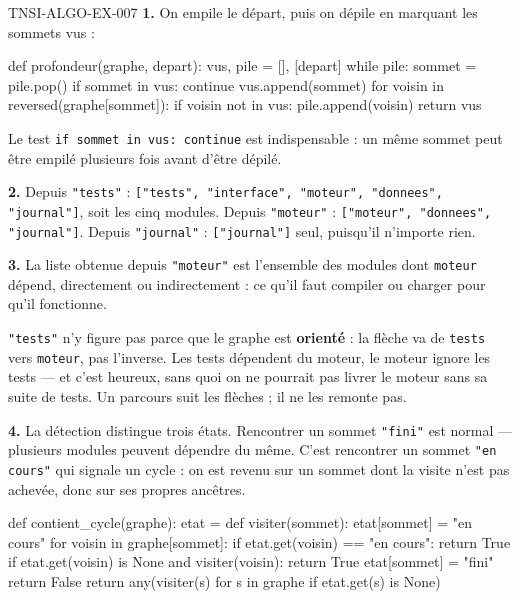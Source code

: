 \begin{corrige}{TNSI-ALGO-EX-007}
\textbf{1.} On empile le départ, puis on dépile en marquant les sommets vus :
\begin{python}
def profondeur(graphe, depart):
    vus, pile = [], [depart]
    while pile:
        sommet = pile.pop()
        if sommet in vus:
            continue
        vus.append(sommet)
        for voisin in reversed(graphe[sommet]):
            if voisin not in vus:
                pile.append(voisin)
    return vus
\end{python}
Le test \lstinline{if sommet in vus: continue} est indispensable : un même sommet
peut être empilé plusieurs fois avant d'être dépilé.

\textbf{2.} Depuis \lstinline{"tests"} :
\lstinline{["tests", "interface", "moteur", "donnees", "journal"]}, soit les cinq
modules. Depuis \lstinline{"moteur"} :
\lstinline{["moteur", "donnees", "journal"]}. Depuis \lstinline{"journal"} :
\lstinline{["journal"]} seul, puisqu'il n'importe rien.

\textbf{3.} La liste obtenue depuis \lstinline{"moteur"} est l'ensemble des
modules dont \lstinline{moteur} dépend, directement ou indirectement : ce qu'il
faut compiler ou charger pour qu'il fonctionne.

\lstinline{"tests"} n'y figure pas parce que le graphe est \textbf{orienté} : la
flèche va de \lstinline{tests} vers \lstinline{moteur}, pas l'inverse. Les tests
dépendent du moteur, le moteur ignore les tests — et c'est heureux, sans quoi on
ne pourrait pas livrer le moteur sans sa suite de tests. Un parcours suit les
flèches ; il ne les remonte pas.

\textbf{4.} La détection distingue trois états. Rencontrer un sommet
\lstinline{"fini"} est normal — plusieurs modules peuvent dépendre du même. C'est
rencontrer un sommet \lstinline{"en cours"} qui signale un cycle : on est revenu
sur un sommet dont la visite n'est pas achevée, donc sur ses propres ancêtres.
\begin{python}
def contient_cycle(graphe):
    etat = {}
    def visiter(sommet):
        etat[sommet] = "en cours"
        for voisin in graphe[sommet]:
            if etat.get(voisin) == "en cours":
                return True
            if etat.get(voisin) is None and visiter(voisin):
                return True
        etat[sommet] = "fini"
        return False
    return any(visiter(s) for s in graphe if etat.get(s) is None)
\end{python}


\end{corrige}
